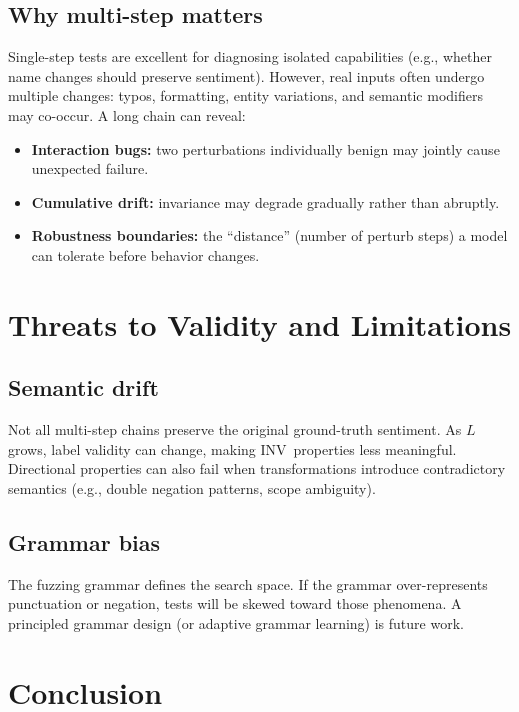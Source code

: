 \documentclass[11pt]{article}
\newcommand{\INV}{\textsc{INV}}
\begin{document}
\subsection{Why multi-step matters}
Single-step tests are excellent for diagnosing isolated capabilities (e.g., whether name changes should preserve sentiment). However, real inputs often undergo multiple changes: typos, formatting, entity variations, and semantic modifiers may co-occur. A long chain can reveal:
\begin{itemize}
  \item \textbf{Interaction bugs:} two perturbations individually benign may jointly cause unexpected failure.
  \item \textbf{Cumulative drift:} invariance may degrade gradually rather than abruptly.
  \item \textbf{Robustness boundaries:} the ``distance'' (number of perturb steps) a model can tolerate before behavior changes.
\end{itemize}

\section{Threats to Validity and Limitations}

\subsection{Semantic drift}
Not all multi-step chains preserve the original ground-truth sentiment. As $L$ grows, label validity can change, making \INV\ properties less meaningful. Directional properties can also fail when transformations introduce contradictory semantics (e.g., double negation patterns, scope ambiguity).

\subsection{Grammar bias}
The fuzzing grammar defines the search space. If the grammar over-represents punctuation or negation, tests will be skewed toward those phenomena. A principled grammar design (or adaptive grammar learning) is future work.


\section{Conclusion}
\end{document}
